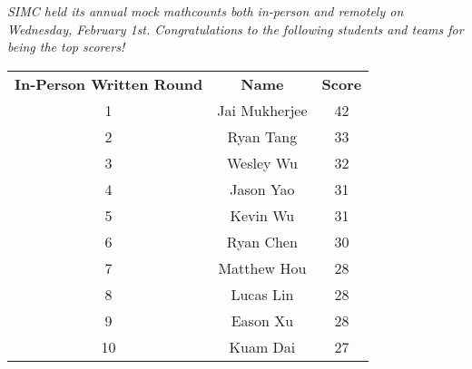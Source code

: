 \documentclass{article}
\date{\hspace{30mm}}
\begin{document}
\maketitle
\begin{minipage}[t]{.45\textwidth}\thispagestyle{empty}
  \vspace{-11mm}
  \tableofcontents
\end{minipage}%
\begin{minipage}[t]{.1\textwidth}\thispagestyle{empty}
  \;
\end{minipage}%
\begin{minipage}[t]{.45\textwidth}\thispagestyle{empty}
  \footnotesize
  \setlength{\parskip}{5pt}
  \vspace{-7mm}
  {\itshape 
  SIMC held its annual mock mathcounts both in-person and remotely on Wednesday, February 1st. Congratulations to the following students and teams for being the top scorers!
    
    \begin{center}
        \begin{tabular}{c c c}
        \hline
           \textbf{In-Person Written Round}   & \textbf{Name} & \textbf{Score} \\
           1 & Jai Mukherjee & 42  \\
           2 & Ryan Tang & 33 \\
           3 & Wesley Wu & 32 \\
           4 & Jason Yao & 31 \\
           5 & Kevin Wu & 31 \\
           6 & Ryan Chen & 30 \\
           7 & Matthew Hou & 28 \\
           8 & Lucas Lin & 28 \\
           9 & Eason Xu & 28 \\
           10 & Kuam Dai & 27 \\
           \hline
        \end{tabular}
    \end{center}
    
}
\end{minipage}
\end{document}
